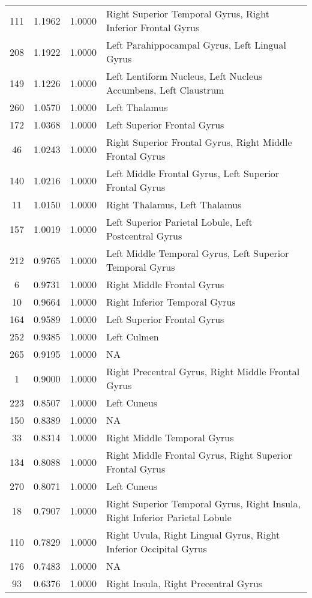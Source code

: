 \documentclass[10pt,letterpaper]{article}\usepackage[]{graphicx}\usepackage[]{color}
\begin{document}
\begin{center}
\begin{longtable}[c]{cccp{4in}}
		111	& 1.1962 & 1.0000 & Right Superior Temporal Gyrus, Right Inferior Frontal Gyrus \\
		208	& 1.1922 & 1.0000 & Left Parahippocampal Gyrus, Left Lingual Gyrus \\
		149	& 1.1226 & 1.0000 & Left Lentiform Nucleus, Left Nucleus Accumbens, Left Claustrum \\
		260	& 1.0570 & 1.0000 & Left Thalamus \\
		172	& 1.0368 & 1.0000 & Left Superior Frontal Gyrus \\
		46	& 1.0243 & 1.0000 & Right Superior Frontal Gyrus, Right Middle Frontal Gyrus \\
		140	& 1.0216 & 1.0000 & Left Middle Frontal Gyrus, Left Superior Frontal Gyrus \\
		11	& 1.0150 & 1.0000 & Right Thalamus, Left Thalamus \\
		157	& 1.0019 & 1.0000 & Left Superior Parietal Lobule, Left Postcentral Gyrus \\
		212	& 0.9765 & 1.0000 & Left Middle Temporal Gyrus, Left Superior Temporal Gyrus \\
		6	& 0.9731 & 1.0000 & Right Middle Frontal Gyrus \\
		10	& 0.9664 & 1.0000 & Right Inferior Temporal Gyrus \\
		164	& 0.9589 & 1.0000 & Left Superior Frontal Gyrus \\
		252	& 0.9385 & 1.0000 & Left Culmen \\
		265	& 0.9195 & 1.0000 & NA \\
		1	& 0.9000 & 1.0000 & Right Precentral Gyrus, Right Middle Frontal Gyrus \\
		223	& 0.8507 & 1.0000 & Left Cuneus \\
		150	& 0.8389 & 1.0000 & NA \\
		33	& 0.8314 & 1.0000 & Right Middle Temporal Gyrus \\
		134	& 0.8088 & 1.0000 & Right Middle Frontal Gyrus, Right Superior Frontal Gyrus \\
		270	& 0.8071 & 1.0000 & Left Cuneus \\
		18	& 0.7907 & 1.0000 & Right Superior Temporal Gyrus, Right Insula, Right Inferior Parietal Lobule \\
		110	& 0.7829 & 1.0000 & Right Uvula, Right Lingual Gyrus, Right Inferior Occipital Gyrus \\
		176	& 0.7483 & 1.0000 & NA \\
		93	& 0.6376 & 1.0000 & Right Insula, Right Precentral Gyrus \\

\end{longtable}
\end{center}
\end{document}
